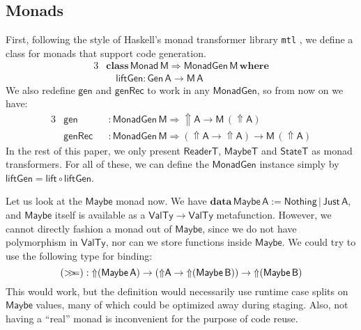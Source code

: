 \documentclass[acmsmall]{acmart}
\newcommand{\mit}[1]{{\mathsf{#1}}}
\newcommand{\msf}[1]{{\mathsf{#1}}}
\newcommand{\mbf}[1]{{\mathbf{#1}}}
\newcommand{\ind}{\hspace{1em}}
\newcommand{\data}{\mbf{data}\,}
\newcommand{\where}{\mbf{where}}
\newcommand{\M}{\msf{M}}
\newcommand{\vA}{\mathsf{A}}
\newcommand{\vB}{\mathsf{B}}
\newcommand{\vM}{\mathsf{M}}
\newcommand{\ReaderT}{\msf{ReaderT}}
\newcommand{\Monad}{\msf{Monad}}
\newcommand{\Up}{{\Uparrow}}
\newcommand{\bind}{\mathbin{>\!\!>\mkern-6.7mu=}}
\newcommand{\VTy}{\msf{ValTy}}
\newcommand{\Maybe}{\msf{Maybe}}
\newcommand{\MaybeT}{\msf{MaybeT}}
\newcommand{\Nothing}{\msf{Nothing}}
\newcommand{\Just}{\msf{Just}}
\theoremstyle{remark}
\newcommand{\tyclass}{\mbf{class}}
\newcommand{\Gen}{\msf{Gen}}
\newcommand{\gen}{\mit{gen}}
\newcommand{\genRec}{\mit{genRec}}
\newcommand{\lift}{\mit{lift}}
\newcommand{\liftGen}{\mit{liftGen}}
\newcommand{\MonadGen}{\msf{MonadGen}}
\newcommand{\RA}{\Rightarrow}
\newcommand{\StateT}{\msf{StateT}}
\begin{document}
\subsection{Monads}\label{sec:monads}

First, following the style of Haskell's monad transformer library \texttt{mtl}
\cite{mtl}, we define a class for monads that support code generation.
\begin{alignat*}{3}
&\tyclass\,\Monad\,\vM \RA \MonadGen\,\vM\,\where\\
&\ind \liftGen : \Gen\,\vA \to \M\,\vA
\end{alignat*}
We also redefine $\gen$ and $\genRec$ to work in any $\MonadGen$, so from now on
we have:
\begin{alignat*}{3}
 &\gen   &&: \MonadGen\,\vM \RA \Up \vA \to \vM\,(\Up \vA)\\
 &\genRec &&: \MonadGen\,\vM \RA (\Up \vA \to \Up \vA) \to \vM\,(\Up \vA)
\end{alignat*}
In the rest of this paper, we only present $\ReaderT$, $\MaybeT$ and
$\StateT$ as monad transformers. For all of these, we can define the $\MonadGen$
instance simply by $\liftGen = \lift \circ \liftGen$.

Let us look at the $\Maybe$ monad now. We have $\data \Maybe\,\vA :=
\Nothing\,|\,\Just\,\vA$, and $\Maybe$ itself is available as a $\VTy \to \VTy$
metafunction. However, we cannot directly fashion a monad out of $\Maybe$, since
we do not have polymorphism in $\VTy$, nor can we store functions inside
$\Maybe$. We could try to use the following type for binding:
\[ (\bind) : \Up(\Maybe\,\vA) \to (\Up\vA \to \Up(\Maybe\,\vB)) \to \Up(\Maybe\,\vB) \]
This would work, but the definition would necessarily use runtime case splits on $\Maybe$
values, many of which could be optimized away during staging. Also, not having
a ``real'' monad is inconvenient for the purpose of code reuse.
\end{document}
